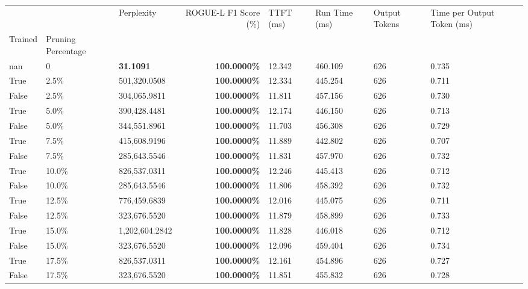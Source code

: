 \begin{table}[H]
\label{tab:evaluation-pipeline-5}
\begin{tabular}{lllrllll}
\toprule
 &  & Perplexity & ROGUE-L F1 Score (\%) & TTFT (ms) & Run Time (ms) & Output Tokens & Time per Output Token (ms) \\
Trained & Pruning Percentage &  &  &  &  &  &  \\
\midrule
nan & 0 & \bfseries 31.1091 & \bfseries 100.0000\% & 12.342 & 460.109 & 626 & 0.735 \\
\cline{1-8}
True & 2.5\% & 501,320.0508 & \bfseries \color{red} 100.0000\% & 12.334 & 445.254 & 626 & 0.711 \\
\cline{1-8}
False & 2.5\% & 304,065.9811 & \bfseries \color{red} 100.0000\% & 11.811 & 457.156 & 626 & 0.730 \\
\cline{1-8}
True & 5.0\% & 390,428.4481 & \bfseries \color{red} 100.0000\% & 12.174 & 446.150 & 626 & 0.713 \\
\cline{1-8}
False & 5.0\% & 344,551.8961 & \bfseries \color{red} 100.0000\% & 11.703 & 456.308 & 626 & 0.729 \\
\cline{1-8}
True & 7.5\% & 415,608.9196 & \bfseries \color{red} 100.0000\% & 11.889 & 442.802 & 626 & 0.707 \\
\cline{1-8}
False & 7.5\% & \color{red} 285,643.5546 & \bfseries \color{red} 100.0000\% & 11.831 & 457.970 & 626 & 0.732 \\
\cline{1-8}
True & 10.0\% & 826,537.0311 & \bfseries \color{red} 100.0000\% & 12.246 & 445.413 & 626 & 0.712 \\
\cline{1-8}
False & 10.0\% & \color{red} 285,643.5546 & \bfseries \color{red} 100.0000\% & 11.806 & 458.392 & 626 & 0.732 \\
\cline{1-8}
True & 12.5\% & 776,459.6839 & \bfseries \color{red} 100.0000\% & 12.016 & 445.075 & 626 & 0.711 \\
\cline{1-8}
False & 12.5\% & 323,676.5520 & \bfseries \color{red} 100.0000\% & 11.879 & 458.899 & 626 & 0.733 \\
\cline{1-8}
True & 15.0\% & 1,202,604.2842 & \bfseries \color{red} 100.0000\% & 11.828 & 446.018 & 626 & 0.712 \\
\cline{1-8}
False & 15.0\% & 323,676.5520 & \bfseries \color{red} 100.0000\% & 12.096 & 459.404 & 626 & 0.734 \\
\cline{1-8}
True & 17.5\% & 826,537.0311 & \bfseries \color{red} 100.0000\% & 12.161 & 454.896 & 626 & 0.727 \\
\cline{1-8}
False & 17.5\% & 323,676.5520 & \bfseries \color{red} 100.0000\% & 11.851 & 455.832 & 626 & 0.728 \\

\end{tabular}
\end{table}
